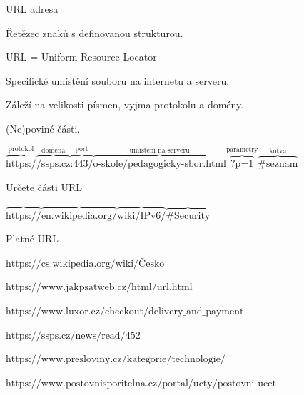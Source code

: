 \documentclass[aspectratio=1610]{beamer}
\begin{document}
\begin{frame}{URL adresa}
    \begin{cardTiny}
        \begin{flushleft}
            Řetězec znaků s definovanou strukturou.

            \vspace{2ex}
            URL = Uniform Resource Locator

            Specifické umístění souboru na internetu a serveru.

            Záleží na velikosti písmen, vyjma protokolu a domény.

            (Ne)poviné části.
        \end{flushleft}
    \end{cardTiny}
    \begin{cardTiny}
        \begin{center}
            $ \overbrace{\text{https:/}}^{\text{protokol}}
            \overbrace{\text{/ssps.cz}}^{\text{doména}}
            \overbrace{\text{:443/}}^{\text{port}}
            \overbrace{\text{o-skole/pedagogicky-sbor.html}}^{\text{umístění na serveru}}
            \overbrace{\text{?p=1}}^{\text{parametry}}
            \overbrace{\text{\#seznam}}^{\text{kotva}} $
        \end{center}
    \end{cardTiny}
\end{frame}

\begin{frame}{Určete části URL} 
    \begin{cardTiny}
        \begin{center}
            $ \overbrace{\text{https://}}^{\text{ }}
            \overbrace{\text{en.wikipedia.org/}}^{\text{ }}
            \overbrace{\text{wiki/IPv6/}}^{\text{ }}
            \overbrace{\text{\#Security}}^{\text{ }} $
        \end{center}
    \end{cardTiny}
\end{frame}

\begin{frame}{Platné URL}
    \begin{cardTiny}
        \begin{flushleft}
            $ \text{https://cs.wikipedia.org/wiki/Česko} $

            $ \text{https://www.jakpsatweb.cz/html/url.html} $

            $ \text{https://www.luxor.cz/checkout/delivery\_and\_payment} $

            $ \text{https://ssps.cz/news/read/452} $

            $ \text{https://www.presloviny.cz/kategorie/technologie/} $

            $ \text{https://www.postovnisporitelna.cz/portal/ucty/postovni-ucet} $
        \end{flushleft}
    \end{cardTiny}
\end{frame}
\end{document}
